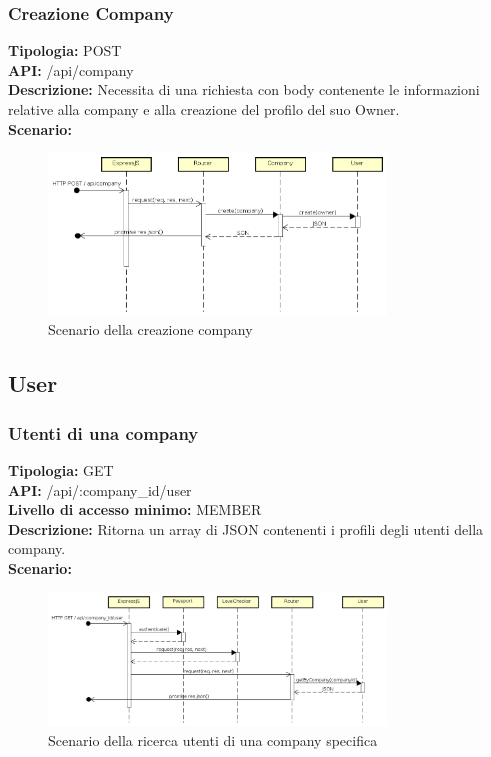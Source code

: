 \newpage
\subsubsection{Creazione Company}
\textbf{Tipologia:} POST \\
\textbf{API:} /api/company \\
\textbf{Descrizione:} Necessita di una richiesta con body contenente le informazioni relative alla company e alla creazione del profilo del suo Owner. \\
\textbf{Scenario:} 
\begin{figure}[h]
\centering
\includegraphics[width=0.8\textwidth]{res/sections/backend/(POST)company.png}
\caption{Scenario della creazione company}
\end{figure}

\newpage
\subsection{User}
\subsubsection{Utenti di una company}
\textbf{Tipologia:} GET \\
\textbf{API:} /api/:company\_id/user \\
\textbf{Livello di accesso minimo:} MEMBER \\
\textbf{Descrizione:} Ritorna un array di JSON contenenti i profili degli utenti della company. \\
\textbf{Scenario:} 
\begin{figure}[h]
\centering
\includegraphics[width=0.8\textwidth]{res/sections/backend/(GET)user.png}
\caption{Scenario della ricerca utenti di una company specifica}
\end{figure}

